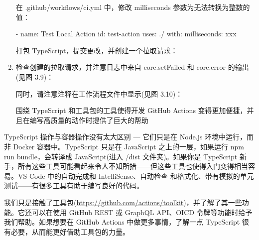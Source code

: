 \begin{enumerate}
在 .github/workflows/ci.yml 中，修改 milliseconds 参数为无法转换为整数的值：

\begin{shell}
- name: Test Local Action
  id: test-action
  uses: ./
  with:
    milliseconds: xxx
\end{shell}

打包 TypeScript，提交更改，并创建一个拉取请求：

  
\item 
检查创建的拉取请求，并注意日志中来自 core.setFailed 和 core.error 的输出(见图 3.9)：


同时，请注意注释在工作流程文件中显示(见图 3.10)：


围绕 TypeScript 和工具包的工具使得开发 GitHub Actions 变得更加便捷，并且在编写高质量的动作时提供了巨大的帮助
\end{enumerate}


TypeScript 操作与容器操作没有太大区别 --- 它们只是在 Node.js 环境中运行，而非 Docker 容器中。TypeScript 只是在 JavaScript 之上的一层，如果运行 npm run bundle，会转译成 JavaScript(进入 /dist 文件夹)。如果你是 TypeScript 新手，所有这些工具可能看起来令人不知所措——但这些工具也使得入门变得相当容易。VS Code 中的自动完成和 IntelliSense、自动检查 和格式化、带有模拟的单元测试——有很多工具有助于编写良好的代码。


我们只是接触了工具包(\url{https://github.com/actions/toolkit})，并了解了其一些功能。它还可以在使用 GitHub REST 或 GraphQL API、OICD 令牌等功能时给予我们帮助。如果想要在 GitHub Actions 中做更多事情，了解一点 TypeScript 很有必要，从而能更好借助工具包的力量。

